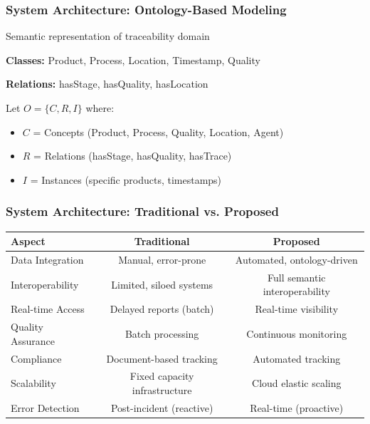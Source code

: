 \documentclass[11pt]{beamer}
\begin{document}
\begin{frame}
  \frametitle{System Architecture: Ontology-Based Modeling}
  
  Semantic representation of traceability domain
  
  \textbf{Classes:} Product, Process, Location, Timestamp, Quality
  
  \textbf{Relations:} hasStage, hasQuality, hasLocation
  
  \vspace{0.5cm}
  
  Let $O = \{C, R, I\}$ where:
  \begin{itemize}
    \item $C$ = Concepts (Product, Process, Quality, Location, Agent)
    \item $R$ = Relations (hasStage, hasQuality, hasTrace)
    \item $I$ = Instances (specific products, timestamps)
  \end{itemize}
\end{frame}

\begin{frame}[fragile]
  \frametitle{System Architecture: Traditional vs. Proposed}
  
  \tiny
  \begin{center}
    \begin{tabular}{|l|c|c|}
      \hline
      \textbf{Aspect} & \textbf{Traditional} & \textbf{Proposed} \\
      \hline
      Data Integration & Manual, error-prone & Automated, ontology-driven \\
      Interoperability & Limited, siloed systems & Full semantic interoperability \\
      Real-time Access & Delayed reports (batch) & Real-time visibility \\
      Quality Assurance & Batch processing & Continuous monitoring \\
      Compliance & Document-based tracking & Automated tracking \\
      Scalability & Fixed capacity infrastructure & Cloud elastic scaling \\
      Error Detection & Post-incident (reactive) & Real-time (proactive) \\
      \hline
    \end{tabular}
  \end{center}
\end{frame}
\end{document}
